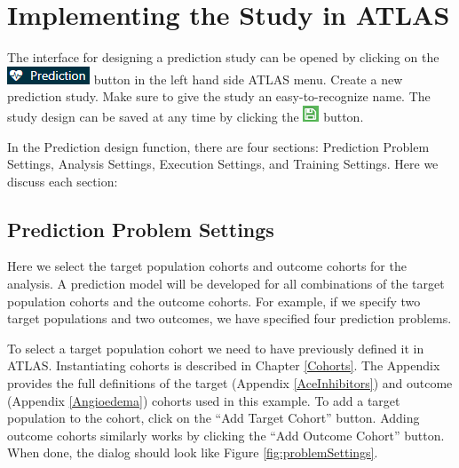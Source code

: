 \documentclass[11pt]{book}
\theoremstyle{definition}
\theoremstyle{definition}
\theoremstyle{definition}
\theoremstyle{remark}
\begin{document}
\section{Implementing the Study in
ATLAS}\label{implementing-the-study-in-atlas}

The interface for designing a prediction study can be opened by clicking
on the
\includegraphics{images/PatientLevelPrediction/predictionButton.png}
button in the left hand side ATLAS menu. Create a new prediction study.
Make sure to give the study an easy-to-recognize name. The study design
can be saved at any time by clicking the
\includegraphics{images/PopulationLevelEstimation/save.png} button.

In the Prediction design function, there are four sections: Prediction
Problem Settings, Analysis Settings, Execution Settings, and Training
Settings. Here we discuss each section:

\subsection{Prediction Problem
Settings}\label{prediction-problem-settings}

Here we select the target population cohorts and outcome cohorts for the
analysis. A prediction model will be developed for all combinations of
the target population cohorts and the outcome cohorts. For example, if
we specify two target populations and two outcomes, we have specified
four prediction problems.

To select a target population cohort we need to have previously defined
it in ATLAS. Instantiating cohorts is described in Chapter
\ref{Cohorts}. The Appendix provides the full definitions of the target
(Appendix \ref{AceInhibitors}) and outcome (Appendix \ref{Angioedema})
cohorts used in this example. To add a target population to the cohort,
click on the ``Add Target Cohort'' button. Adding outcome cohorts
similarly works by clicking the ``Add Outcome Cohort'' button. When
done, the dialog should look like Figure \ref{fig:problemSettings}.
\end{document}
